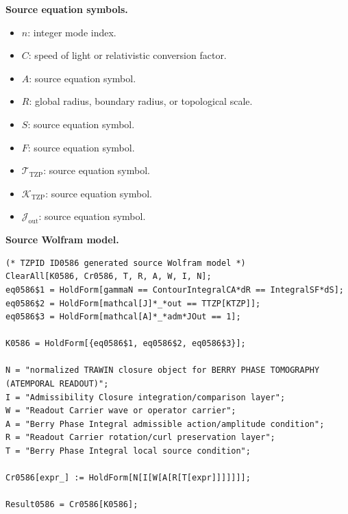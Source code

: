 \begin{minipage}[t]{0.49\linewidth}
\begingroup
\small
\raggedright
\textbf{Source equation symbols.}\par
\begin{itemize}[leftmargin=1.35em,itemsep=1pt,topsep=1pt,parsep=0pt]
    \item $n$: integer mode index.
    \item $C$: speed of light or relativistic conversion factor.
    \item $A$: source equation symbol.
    \item $R$: global radius, boundary radius, or topological scale.
    \item $S$: source equation symbol.
    \item $F$: source equation symbol.
    \item $\mathcal{T}_{\mathrm{TZP}}$: source equation symbol.
    \item $\mathcal{K}_{\mathrm{TZP}}$: source equation symbol.
    \item $\mathcal{J}_{\mathrm{out}}$: source equation symbol.
\end{itemize}
\endgroup
\end{minipage}\hfill
\begin{minipage}[t]{0.47\linewidth}
\begingroup
\scriptsize
\raggedright
\textbf{Source Wolfram model.}\par
\begin{Verbatim}[fontsize=\tiny,breaklines=true,breakanywhere=true]
(* TZPID ID0586 generated source Wolfram model *)
ClearAll[K0586, Cr0586, T, R, A, W, I, N];
eq0586$1 = HoldForm[gammaN == ContourIntegralCA*dR == IntegralSF*dS];
eq0586$2 = HoldForm[mathcal[J]*_*out == TTZP[KTZP]];
eq0586$3 = HoldForm[mathcal[A]*_*adm*JOut == 1];

K0586 = HoldForm[{eq0586$1, eq0586$2, eq0586$3}];

N = "normalized TRAWIN closure object for BERRY PHASE TOMOGRAPHY (ATEMPORAL READOUT)";
I = "Admissibility Closure integration/comparison layer";
W = "Readout Carrier wave or operator carrier";
A = "Berry Phase Integral admissible action/amplitude condition";
R = "Readout Carrier rotation/curl preservation layer";
T = "Berry Phase Integral local source condition";

Cr0586[expr_] := HoldForm[N[I[W[A[R[T[expr]]]]]]];

Result0586 = Cr0586[K0586];
\end{Verbatim}
\endgroup
\end{minipage}

